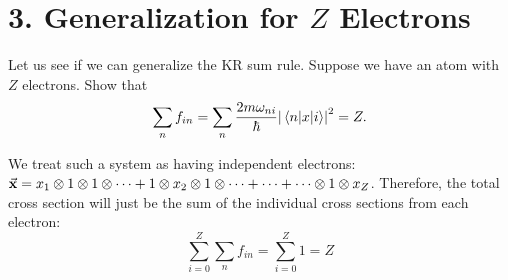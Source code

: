 \documentclass[a4paper,twoside]{article}
\begin{document}
\section*{3. Generalization for $ Z $ Electrons}
Let us see if we can generalize the KR sum rule. Suppose we have an atom with $ Z $ electrons. Show that
\begin{equation}
    \sum_n f_{in} = \sum_n \frac{2m \omega_{ni}}{\hbar} \abs{\mel{n}{x}{i}}^2 = Z.
\end{equation}
\begin{problem}
    We treat such a system as having independent electrons: $ \va{x} = x_1 \otimes 1 \otimes 1 \otimes \cdots + 1 \otimes x_2 \otimes 1 \otimes \cdots + \cdots + \cdots \otimes 1 \otimes x_Z $. Therefore, the total cross section will just be the sum of the individual cross sections from each electron:
    \begin{equation}
        \sum_{i=0}^{Z} \sum_n f_{in} = \sum_{i=0}^{Z} 1 = Z
    \end{equation}
\end{problem}
\end{document}

